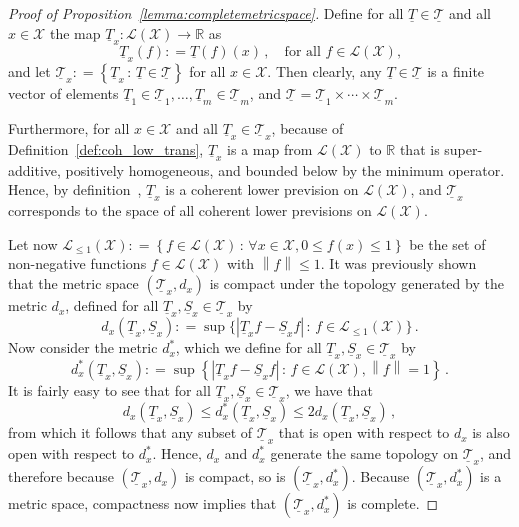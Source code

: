 \documentclass[10pt]{paper}
\theoremstyle{definition}
\newcommand{\reals}{\mathbb{R}}
\newcommand{\states}{\mathcal{X}}
\newcommand{\lt}{\underline{T}}
\newcommand{\gambles}{\mathcal{L}}
\newcommand{\gamblesX}{\gambles(\states)}
\newcommand{\norm}[1]{\left\lVert #1 \right\rVert}
\newcommand{\abs}[1]{\left\vert #1 \right\vert}
\newcommand{\coloneqq}{:\!=}
\begin{document}
\begin{proof}[Proof of Proposition~\ref{lemma:completemetricspace}]
Define for all $\lt\in\underline{\mathcal{T}}$ and all $x\in\states$ the map $\lt_x:\gamblesX\rightarrow\reals$ as
\begin{equation*}
\lt_x(f) \coloneqq \lt(f)(x)\,,\quad\text{for all $f\in\gamblesX$,}
\end{equation*}
and let $\underline{\mathcal{T}}_x\coloneqq\left\{\lt_x\,:\,\lt\in\underline{\mathcal{T}}\right\}$ for all $x\in\states$. Then clearly, any $\lt\in\underline{\mathcal{T}}$ is a finite vector of elements $\lt_1\in\underline{\mathcal{T}}_1,\ldots,\lt_m\in\underline{\mathcal{T}}_m$, and $\underline{\mathcal{T}}=\underline{\mathcal{T}}_1\times\cdots\times \underline{\mathcal{T}}_m$.

Furthermore, for all $x\in\states$ and all $\lt_x\in\underline{\mathcal{T}}_x$, because of Definition~\ref{def:coh_low_trans}, $\lt_x$ is a map from $\gamblesX$ to $\reals$ that is super-additive, positively homogeneous, and bounded below by the minimum operator. Hence, by definition~\cite[Definition~2.3.3]{Walley:1991vk}, $\lt_x$ is a coherent lower prevision on $\gamblesX$, and $\underline{\mathcal{T}}_x$ corresponds to the space of all coherent lower previsions on $\gamblesX$.

Let now $\gambles_{\leq1}(\states)\coloneqq\left\{f\in\gamblesX\,:\,\forall x\in\states, 0\leq f(x)\leq 1\right\}$ be the set of non-negative functions $f\in\gamblesX$ with $\norm{f}\leq 1$. It was previously shown~\cite{DeBock:2015ck} that the metric space $(\underline{\mathcal{T}}_x,d_x)$ is compact under the topology generated by the metric $d_x$, defined for all $\lt_x,\underline{S}_x\in\underline{\mathcal{T}}_x$ by
\begin{equation*}
d_x(\lt_x,\underline{S}_x) \coloneqq \sup\bigl\{ \abs{\lt_xf - \underline{S}_xf} \,:\,f\in\gambles_{\leq1}(\states) \bigr\}\,.
\end{equation*}
Now consider the metric $d_x^*$, which we define for all $\lt_x,\underline{S}_x\in\underline{\mathcal{T}}_x$ by
\begin{equation*}
d_x^*(\lt_x,\underline{S}_x) \coloneqq \sup\left\{ \abs{\lt_xf - \underline{S}_xf}\,:\, f\in\gamblesX, \norm{f}=1\right\}\,.
\end{equation*}
It is fairly easy to see that for all $\lt_x,\underline{S}_x\in\underline{\mathcal{T}}_x$, we have that
\begin{equation*}
d_x(\lt_x,\underline{S}_x) \leq d_x^*(\lt_x,\underline{S}_x) \leq 2d_x(\lt_x,\underline{S}_x)\,,
\end{equation*}
from which it follows that any subset of $\underline{\mathcal{T}}_x$ that is open with respect to $d_x$ is also open with respect to $d_x^*$. Hence, $d_x$ and $d_x^*$ generate the same topology on $\underline{\mathcal{T}}_x$, and therefore because $(\underline{\mathcal{T}}_x, d_x)$ is compact, so is $(\underline{\mathcal{T}}_x,d_x^*)$. Because $(\underline{\mathcal{T}}_x,d_x^*)$ is a metric space, compactness now implies that $(\underline{\mathcal{T}}_x,d_x^*)$ is complete.


\end{proof}
\end{document}
